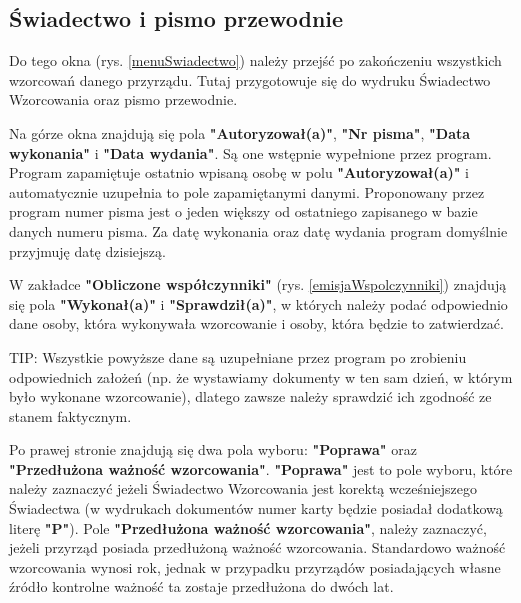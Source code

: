 {{{\subsection{Świadectwo i pismo przewodnie}
\label{swiadectwo_pismo}

	Do tego okna (rys. \ref{menuSwiadectwo}) należy przejść po zakończeniu wszystkich wzorcowań danego przyrządu. Tutaj przygotowuje się do wydruku Świadectwo Wzorcowania oraz pismo przewodnie. 
	
	Na górze okna znajdują się pola \textbf{"Autoryzował(a)"}, \textbf{"Nr pisma"}, \textbf{"Data wykonania"} i \textbf{"Data wydania"}. Są one wstępnie wypełnione przez program. Program zapamiętuje ostatnio wpisaną osobę w polu \textbf{"Autoryzował(a)"} i automatycznie uzupełnia to pole zapamiętanymi danymi. Proponowany przez program numer pisma jest o jeden większy od ostatniego zapisanego w bazie danych numeru pisma. Za datę wykonania oraz datę wydania program domyślnie przyjmuję datę dzisiejszą.

	W zakładce \textbf{"Obliczone współczynniki"} (rys. \ref{emisjaWspolczynniki}) znajdują się pola \textbf{"Wykonał(a)"} i \textbf{"Sprawdził(a)"}, w których należy podać odpowiednio dane osoby, która wykonywała wzorcowanie i osoby, która będzie to zatwierdzać. 

	TIP: Wszystkie powyższe dane są uzupełniane przez program po zrobieniu odpowiednich założeń (np. że wystawiamy dokumenty w ten sam dzień, w którym było wykonane wzorcowanie), dlatego zawsze należy sprawdzić ich zgodność ze stanem faktycznym.
	
	Po prawej stronie znajdują się dwa pola wyboru: \textbf{"Poprawa"} oraz \textbf{"Przedłużona ważność wzorcowania"}. \textbf{"Poprawa"} jest to pole wyboru, które należy zaznaczyć jeżeli Świadectwo Wzorcowania jest korektą wcześniejszego Świadectwa (w wydrukach dokumentów numer karty będzie posiadał dodatkową literę \textbf{"P"}). Pole \textbf{"Przedłużona ważność wzorcowania"}, należy zaznaczyć, jeżeli przyrząd posiada przedłużoną ważność wzorcowania. Standardowo ważność wzorcowania wynosi rok, jednak w przypadku przyrządów posiadających własne źródło kontrolne ważność ta zostaje przedłużona do dwóch lat.

}}}

